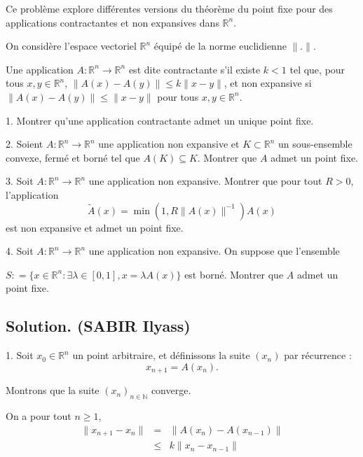 Ce probl{\`e}me explore diff{\'e}rentes versions du th{\'e}or{\`e}me du point
fixe pour des applications contractantes et non expansives dans
$\mathbb{R}^n$.

\begin{exercise}[]
On consid{\`e}re l'espace vectoriel $\mathbb{R}^n$ {\'e}quip{\'e} de la norme
euclidienne $\| . \|$.

Une application $A : \mathbb{R}^n \rightarrow \mathbb{R}^n$ est dite
contractante s'il existe $k < 1$ tel que, pour tous $x, y \in \mathbb{R}^n$,
$\| A (x) - A (y) \| \leqslant k \| x - y \|$, et non expansive si $\| A (x) -
A (y) \| \leqslant \| x - y \|$ pour tous $x, y \in \mathbb{R}^n$.

1. Montrer qu'une application contractante admet un unique point fixe.

2. Soient $A : \mathbb{R}^n \rightarrow \mathbb{R}^n$ une application non
expansive et $K \subset \mathbb{R}^n$ un sous-ensemble convexe, ferm{\'e} et
born{\'e} tel que $A (K) \subseteq K$. Montrer que $A$ admet un point fixe.

3. Soit $A : \mathbb{R}^n \rightarrow \mathbb{R}^n$ une application non
expansive. Montrer que pour tout $R > 0$, l'application
\[ \tilde{A} (x) = \min (1, R \parallel A (x) \parallel^{- 1}) A (x) \]
est non expansive et admet un point fixe.

4. Soit $A : \mathbb{R}^n \rightarrow \mathbb{R}^n$ une application non
expansive. On suppose que l'ensemble

$S : =\{x \in \mathbb{R}^n : \exists \lambda \in [0, 1], x = \lambda A (x)\}$
est born{\'e}. Montrer que $A$ admet un point fixe.

\end{exercise}

\subsection*{Solution. (SABIR Ilyass)}


1. Soit $x_0 \in \mathbb{R}^n$ un point arbitraire, et d{\'e}finissons la
suite $(x_n)$ par r{\'e}currence :
\[ x_{n + 1} = A (x_n) . \]


Montrons que la suite $(x_n)_{n \in \mathbb{N}}$ converge.

On a pour tout $n \geqslant 1$,
\begin{eqnarray*}
  \|x_{n + 1} - x_n \| & = & \|A (x_n) - A (x_{n - 1})\|\\
  & \leqslant & k\|x_n - x_{n - 1} \|
\end{eqnarray*}


